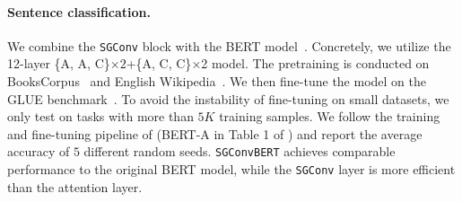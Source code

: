 \paragraph{Sentence classification.}  We combine the \texttt{SGConv} block with the BERT model~\citep{devlin2018bert}. Concretely, we utilize the 12-layer \{A, A, C\}$\times 2$+\{A, C, C\}$\times$2 model. The pretraining is conducted on BooksCorpus~\citep{zhu2015aligning} and  English Wikipedia~\citep{wikidump}. We then fine-tune the model on the GLUE benchmark~\citep{wang2019glue}. To avoid the instability of fine-tuning on small datasets, we only test on tasks with more than $5K$ training samples. We follow the training and fine-tuning pipeline of \citet{ke2020rethinking} (BERT-A in Table 1 of \citet{ke2020rethinking}) and report the average accuracy of $5$ different random seeds. \texttt{SGConvBERT} achieves comparable performance to the original BERT model, while the \texttt{SGConv} layer is more efficient than the attention layer.

